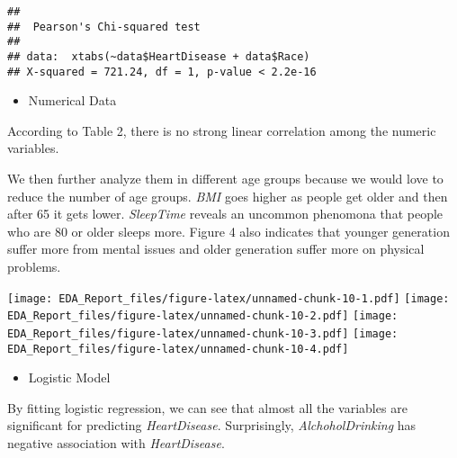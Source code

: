 \documentclass[
  11pt,
]{article}
\providecommand{\tightlist}{%
  \setlength{\itemsep}{0pt}\setlength{\parskip}{0pt}}
\begin{document}
\begin{verbatim}
## 
##  Pearson's Chi-squared test
## 
## data:  xtabs(~data$HeartDisease + data$Race)
## X-squared = 721.24, df = 1, p-value < 2.2e-16
\end{verbatim}

\begin{itemize}
\tightlist
\item
  Numerical Data
\end{itemize}

According to Table 2, there is no strong linear correlation among the
numeric variables.

\begin{table}

\caption{\label{tab:unnamed-chunk-9}Correlation Table}
\centering
{}
\end{table}

We then further analyze them in different age groups because we would
love to reduce the number of age groups. \emph{BMI} goes higher as
people get older and then after 65 it gets lower. \emph{SleepTime}
reveals an uncommon phenomona that people who are 80 or older sleeps
more. Figure 4 also indicates that younger generation suffer more from
mental issues and older generation suffer more on physical problems.

\texttt{[image: EDA\_Report\_files/figure-latex/unnamed-chunk-10-1.pdf]}
\texttt{[image: EDA\_Report\_files/figure-latex/unnamed-chunk-10-2.pdf]}
\texttt{[image: EDA\_Report\_files/figure-latex/unnamed-chunk-10-3.pdf]}
\texttt{[image: EDA\_Report\_files/figure-latex/unnamed-chunk-10-4.pdf]}

\begin{itemize}
\tightlist
\item
  Logistic Model
\end{itemize}

By fitting logistic regression, we can see that almost all the variables
are significant for predicting \emph{HeartDisease}. Surprisingly,
\emph{AlchoholDrinking} has negative association with
\emph{HeartDisease}.
\end{document}
